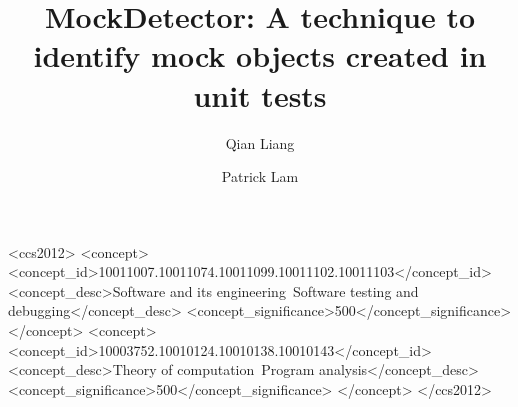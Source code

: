 \documentclass[sigconf,review,anonymous]{acmart}
\begin{document}
\title{MockDetector: A technique to identify mock objects created in unit tests}

\author{Qian Liang}
\author{Patrick Lam}



\begin{CCSXML}
<ccs2012>
<concept>
<concept_id>10011007.10011074.10011099.10011102.10011103</concept_id>
<concept_desc>Software and its engineering~Software testing and debugging</concept_desc>
<concept_significance>500</concept_significance>
</concept>
<concept>
<concept_id>10003752.10010124.10010138.10010143</concept_id>
<concept_desc>Theory of computation~Program analysis</concept_desc>
<concept_significance>500</concept_significance>
</concept>
</ccs2012>
\end{CCSXML}




\maketitle




\end{document}
